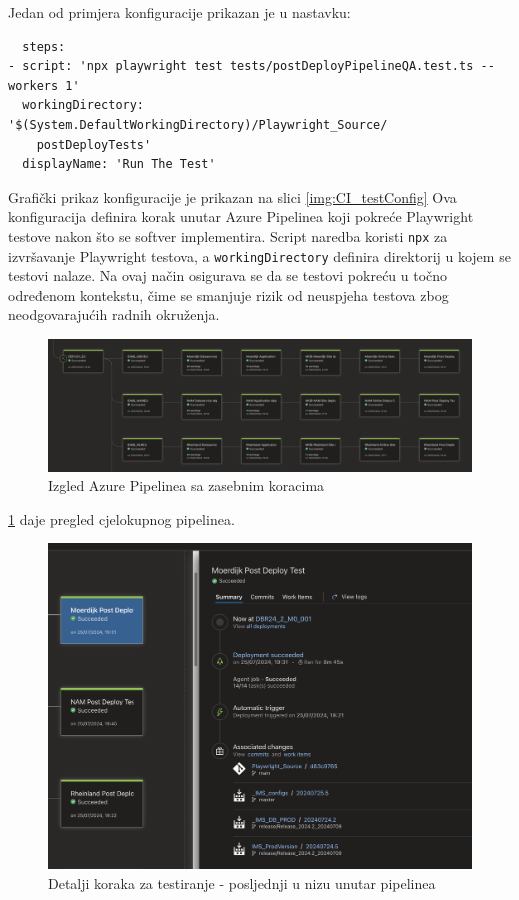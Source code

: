 Jedan od primjera konfiguracije prikazan je u nastavku:
\begin{verbatim}
  steps: 
- script: 'npx playwright test tests/postDeployPipelineQA.test.ts --workers 1' 
  workingDirectory: '$(System.DefaultWorkingDirectory)/Playwright_Source/
    postDeployTests' 
  displayName: 'Run The Test'
\end{verbatim}

Grafički prikaz konfiguracije je prikazan na slici \ref{img:CI_testConfig}  
Ova konfiguracija definira korak unutar Azure Pipelinea koji pokreće Playwright testove nakon što se softver implementira.
Script naredba koristi \texttt{npx} za izvršavanje Playwright testova, a \texttt{workingDirectory} definira direktorij u kojem se testovi nalaze.
Na ovaj način osigurava se da se testovi pokreću u točno određenom kontekstu, čime se smanjuje rizik od neuspjeha testova zbog neodgovarajućih radnih okruženja.


\begin{figure}[!h]\begin{center}
  \includegraphics[width=1\textwidth]{"img/CI_pipelinePreview"}
  \caption{Izgled Azure Pipelinea sa zasebnim koracima}\label{img:CI_pipelinePreview}
\end{center}\end{figure}

\ref{img:CI_pipelinePreview} daje pregled cjelokupnog pipelinea.

\begin{figure}[!h]\begin{center}
  \includegraphics[width=1\textwidth]{"img/CI_pipelineDetails"}
  \caption{Detalji koraka za testiranje - posljednji u nizu unutar pipelinea}\label{img:CI_pipelineDetails}
\end{center}\end{figure}

